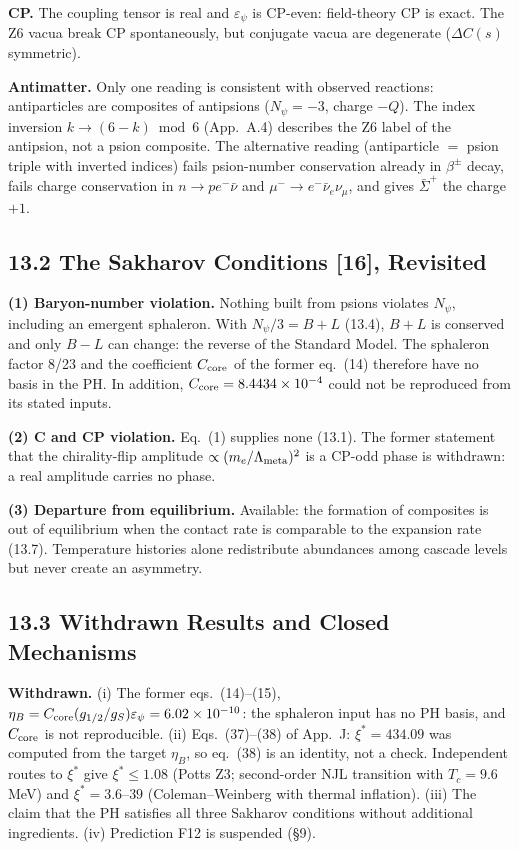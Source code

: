 \documentclass[11pt,letterpaper]{article}
\begin{document}
\noindent \textbf{CP. }The coupling tensor is real and $\varepsilon_\psi$ is CP-even: field-theory CP is exact. The Z6 vacua break CP spontaneously, but conjugate vacua are degenerate ($\Delta C(s)$ symmetric).

\noindent \textbf{Antimatter. }Only one reading is consistent with observed reactions: antiparticles are composites of antipsions ($N_\psi=-3$, charge $-Q$). The index inversion $k\to(6-k)\bmod 6$ (App.~A.4) describes the Z6 label of the antipsion, not a psion composite. The alternative reading (antiparticle $=$ psion triple with inverted indices) fails psion-number conservation already in $\beta^\pm$ decay, fails charge conservation in $n\to pe^-\bar\nu$ and $\mu^-\to e^-\bar\nu_e\nu_\mu$, and gives $\bar\Sigma^+$ the charge $+1$.

\subsection*{13.2  The Sakharov Conditions [16], Revisited}

\noindent \textbf{(1) Baryon-number violation. }Nothing built from psions violates $N_\psi$, including an emergent sphaleron. With $N_\psi/3=B+L$ (13.4), $B+L$ is conserved and only $B-L$ can change: the reverse of the Standard Model. The sphaleron factor 8/23 and the coefficient $C_{\rm core}$ of the former eq.~(14) therefore have no basis in the PH. In addition, $C_{\rm core}=8.4434\times10^{-4}$ could not be reproduced from its stated inputs.

\noindent \textbf{(2) C and CP violation. }Eq.~(1) supplies none (13.1). The former statement that the chirality-flip amplitude $\propto(m_e/\Lambda_{\rm meta})^2$ is a CP-odd phase is withdrawn: a real amplitude carries no phase.

\noindent \textbf{(3) Departure from equilibrium. }Available: the formation of composites is out of equilibrium when the contact rate is comparable to the expansion rate (13.7). Temperature histories alone redistribute abundances among cascade levels but never create an asymmetry.

\subsection*{13.3  Withdrawn Results and Closed Mechanisms}

\noindent \textbf{Withdrawn. }(i) The former eqs.~(14)--(15), $\eta_B = C_{\rm core}(g_{1/2}/g_S)\varepsilon_\psi = 6.02\times10^{-10}$: the sphaleron input has no PH basis, and $C_{\rm core}$ is not reproducible. (ii) Eqs.~(37)--(38) of App.~J: $\xi^*=434.09$ was computed from the target $\eta_B$, so eq.~(38) is an identity, not a check. Independent routes to $\xi^*$ give $\xi^*\le1.08$ (Potts Z3; second-order NJL transition with $T_c=9.6$ MeV) and $\xi^*=3.6$--$39$ (Coleman--Weinberg with thermal inflation). (iii) The claim that the PH satisfies all three Sakharov conditions without additional ingredients. (iv) Prediction F12 is suspended (§9).
\end{document}
